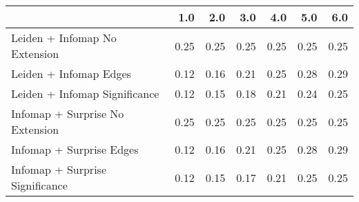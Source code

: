 \begin{tabular}{lrrrrrr}
\toprule
{} &  1.0 &  2.0 &  3.0 &  4.0 &  5.0 &  6.0 \\
\midrule
Leiden + Infomap No Extension   & 0.25 & 0.25 & 0.25 & 0.25 & 0.25 & 0.25 \\
Leiden + Infomap Edges          & 0.12 & 0.16 & 0.21 & 0.25 & 0.28 & 0.29 \\
Leiden + Infomap Significance   & 0.12 & 0.15 & 0.18 & 0.21 & 0.24 & 0.25 \\
Infomap + Surprise No Extension & 0.25 & 0.25 & 0.25 & 0.25 & 0.25 & 0.25 \\
Infomap + Surprise Edges        & 0.12 & 0.16 & 0.21 & 0.25 & 0.28 & 0.29 \\
Infomap + Surprise Significance & 0.12 & 0.15 & 0.17 & 0.21 & 0.25 & 0.25 \\
\bottomrule
\end{tabular}
